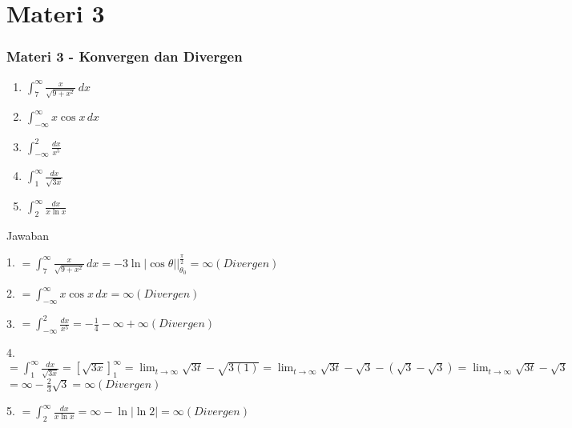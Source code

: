 \documentclass{beamer}
\begin{document}
\section{Materi 3}

\begin{frame}
  \frametitle{Materi 3 - Konvergen dan Divergen}
  
  \begin{enumerate}
    \item \(\displaystyle\int_7^\infty \frac{x}{\sqrt{9+x^2}} \, dx\)
    \item \(\displaystyle\int_{-\infty}^{\infty} x \cos x \, dx\)
    \item \(\displaystyle\int_{-\infty} ^2 \frac{dx}{x^5}\)
    \item $\int_{1}^{\infty}\frac{dx}{\sqrt{3x}}$
    \item \(\displaystyle\int_{2}^{\infty} \frac{dx}{x \ln x}\)
  \end{enumerate}
  
\end{frame}

\begin{frame}{Jawaban}
    \begin{enumerate}
1. $\displaystyle = \int_7^\infty \frac{x}{\sqrt{9+x^2}} \, dx = -3\ln|\cos\theta|\bigg|_{\theta_0}^{\frac{\pi}{2}}=\infty (Divergen)$
    \end{enumerate}
    \begin{enumerate}
2. $\displaystyle =\int_{-\infty}^{\infty} x \cos x \, dx = \infty (Divergen)
$
    \end{enumerate}
    \begin{enumerate}
3. $\displaystyle =\int_{-\infty} ^2 \frac{dx}{x^5}=-\frac{1}{4}-\infty+\infty(Divergen)
$
    \end{enumerate}
    \begin{enumerate}
4. $\displaystyle =\int_{1}^{\infty}\frac{dx}{\sqrt{3x}} = \left[\sqrt{3x}\right]_{1}^{\infty} = \lim_{{t \to \infty}} \sqrt{3t} - \sqrt{3(1)} = \lim_{{t \to \infty}} \sqrt{3t} - \sqrt{3} - (\sqrt{3} - \sqrt{3}) = \lim_{{t \to \infty}} \sqrt{3t} - \sqrt{3}$
    $\displaystyle=\infty-\frac{2}{3}\sqrt{3}=\infty(Divergen)$
    \end{enumerate}
    \begin{enumerate}
5. $\displaystyle =\int_{2}^{\infty} \frac{dx}{x \ln x}
=\infty-\ln\left|\ln2\right|=\infty(Divergen)$
    \end{enumerate}
\end{frame}
\end{document}
